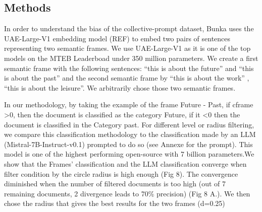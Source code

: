 \documentclass{article}
\begin{document}
\subsection{Methods}

In order to understand the bias of the collective-prompt dataset, Bunka uses the UAE-Large-V1 embedding model (REF) to embed two pairs of sentences representing two semantic frames. We use UAE-Large-V1 as it is one of the top models on the MTEB Leaderboad under 350 million parameters. We create a first semantic frame with the following sentences: “this is about the future” and “this is about the past” and the second semantic frame by “this is about the work” , “this is about the leisure”. We arbitrarily chose those two semantic frames. 

In our methodology, by taking the example of the frame Future - Past, if cframe >0, then the document is classified as the category Future, if it <0 then the document is classified in the Category past. For different level or radius filtering, we compare this classification methodology to the classification made by an LLM (Mistral-7B-Instruct-v0.1) prompted to do so (see Annexe for the prompt). This model is one of the highest performing open-source with 7 billion parameters.We show that the Frames’ classification and the LLM classification converge when filter condition by the circle radius is high enough (Fig 8). The convergence diminished when the number of filtered documents is too high (out of 7 remaining documents, 2 divergence leads to 70\% precision) (Fig 8 A.). We then chose the radius that gives the best results for the two frames (d=0.25)
\end{document}
